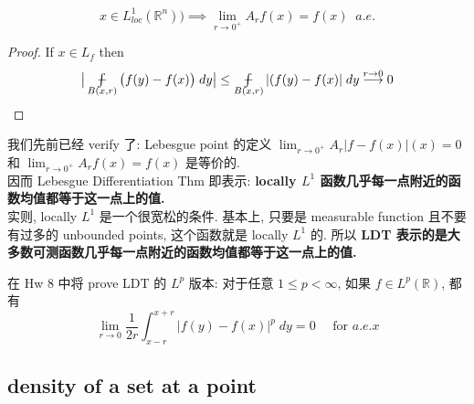 \documentclass[lang=cn,11pt]{elegantbook}
\newcommand*{\avint}{\mathop{\ooalign{$\int$\cr$-$}}}
\begin{document}
\begin{corollary}$$x \in L^1_{loc}(\mathbb{R}^n)) \implies \lim_{r\to 0^+} A_rf(x)= f(x) \;\; a.e.$$
\end{corollary}
\begin{proof}
    If $x \in L_f$ then \[
  \big |\avint_{B(x,r)}  \big(f(y)- f(x) \big)\; dy \big| \leq  \avint_{B(x,r)} |(f(y) - f(x)| \; dy \overset{r\to 0}{\longrightarrow} 0
    \]
\end{proof}
\begin{remark}
    我们先前已经 verify 了: Lebesgue point 的定义 \(\lim_{r\to 0^+} A_r |f- f(x)| (x)  = 0\) 和 \(\lim_{r\to 0^+} A_rf(x)= f(x) \) 是等价的. \\
   因而 Lebesgue Differentiation Thm 即表示: \textbf{locally $L^1$ 函数几乎每一点附近的函数均值都等于这一点上的值.}\\
   实则, locally $L^1$ 是一个很宽松的条件. 基本上, 只要是 measurable function 且不要有过多的 unbounded points, 这个函数就是 locally $L^1$ 的. 所以 \textbf{LDT 表示的是大多数可测函数几乎每一点附近的函数均值都等于这一点上的值.}\\
 \end{remark}

\begin{remark}
    在 Hw 8 中将 prove LDT 的 $L^p$ 版本: 对于任意  $1\le p<\infty$, 如果 $f\in L^p(\mathbb{R})$, 都有 \[
       \lim_{r\to 0} \frac1{2r} \int_{x-r}^{x+r} |f(y)-f(x)|^p \;d y=0 \quad \text{ for } a.e. x
    \]
\end{remark}



\subsection{density of a set at a point}
\end{document}

